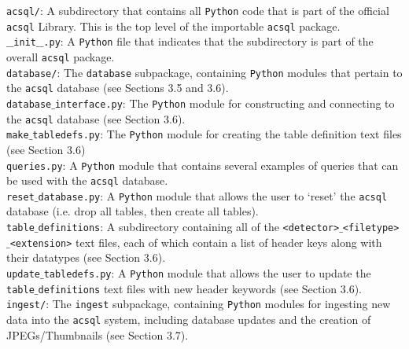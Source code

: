 \documentclass[10pt,journal,compsoc]{IEEEtran}
\begin{document}
\noindent\texttt{acsql/}: A subdirectory that contains all \texttt{Python} code that is part of the official \texttt{acsql} Library.
This is the top level of the importable \texttt{acsql} package.\\

\noindent\texttt{$\_$$\_$init$\_$$\_$.py}: A \texttt{Python} file that indicates that the subdirectory is part of the overall
\texttt{acsql} package.\\

\noindent\texttt{database/}: The \texttt{database} subpackage, containing \texttt{Python} modules that pertain to the \texttt{acsql}
database (see Sections 3.5 and 3.6).\\

\noindent\texttt{database$\_$interface.py}: The \texttt{Python} module for constructing and connecting to the \texttt{acsql} database
(see Section 3.6). \\

\noindent\texttt{make$\_$tabledefs.py}: The \texttt{Python} module for creating the table definition text files (see Section 3.6) \\

\noindent\texttt{queries.py}: A \texttt{Python} module that contains several examples of queries that can be used with the
\texttt{acsql} database.\\

\noindent\texttt{reset$\_$database.py}: A \texttt{Python} module that allows the user to `reset' the \texttt{acsql} database (i.e.
drop all tables, then create all tables).\\

\noindent\texttt{table$\_$definitions}: A subdirectory containing all of the \texttt{<detector>$\_$<filetype>$\_$<extension>} text files,
each of which contain a list of header keys along with their datatypes (see Section 3.6).\\

\noindent\texttt{update$\_$tabledefs.py}: A \texttt{Python} module that allows the user to update the \texttt{table$\_$definitions}
text files with new header keywords (see Section 3.6).\\

\noindent\texttt{ingest/}: The \texttt{ingest} subpackage, containing \texttt{Python} modules for ingesting new data into the
\texttt{acsql} system, including database updates and the creation of JPEGs/Thumbnails (see Section 3.7).\\
\end{document}
